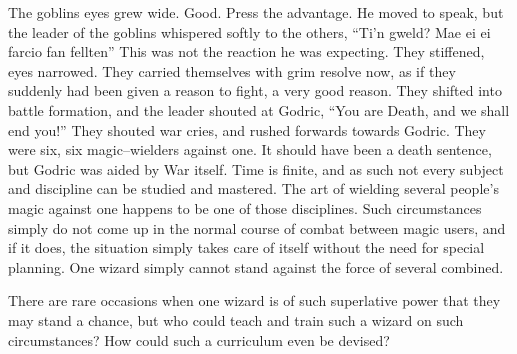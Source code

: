 The goblins eyes grew wide. Good. Press the advantage. He moved to speak, but the leader of the goblins whispered softly to the others, “Ti’n gweld? Mae ei ei farcio fan fellten{\el}”
\SmallVSpace
This was not the reaction he was expecting. They stiffened, eyes narrowed. They carried themselves with grim resolve now, as if they suddenly had been given a reason to fight, a very good reason. They shifted into battle formation, and the leader shouted at Godric, “You are Death, and we shall end you!”
\SmallVSpace
They shouted war cries, and rushed forwards towards Godric. They were six, six magic\mbox{--}wielders against one. It should have been a death sentence, but Godric was aided by War itself.
\SmallVSpace
Time is finite, and as such not every subject and discipline can be studied and mastered. The art of wielding several people’s magic against one happens to be one of those disciplines. Such circumstances simply do not come up in the normal course of combat between magic users, and if it does, the situation simply takes care of itself without the need for special planning. One wizard simply cannot stand against the force of several combined.

There are rare occasions when one wizard is of such superlative power that they may stand a chance, but who could teach and train such a wizard on such circumstances? How could such a curriculum even be devised?

